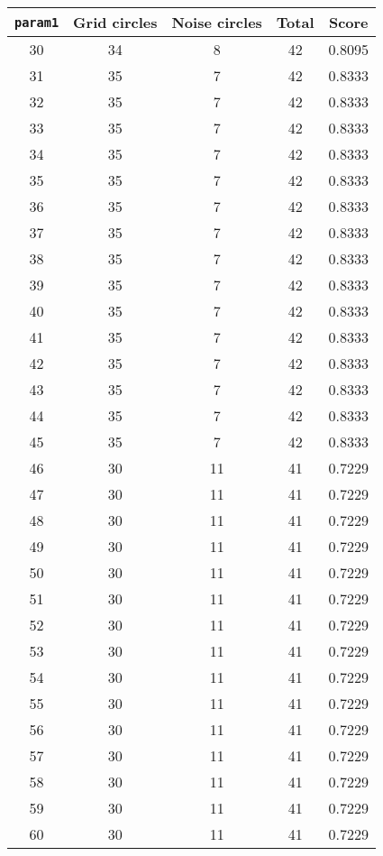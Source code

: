 \documentclass[letterpaper, 12pt]{article}
\begin{document}
\begin{longtable}{|c|c|c|c|c|}
\hline
\textbf{\texttt{param1}} & \textbf{Grid circles} & \textbf{Noise circles} & \textbf{Total} & \textbf{Score} \\
\hline
30 & 34 & 8 & 42 & 0.8095 \\
\hline
31 & 35 & 7 & 42 & 0.8333 \\
\hline
32 & 35 & 7 & 42 & 0.8333 \\
\hline
33 & 35 & 7 & 42 & 0.8333 \\
\hline
34 & 35 & 7 & 42 & 0.8333 \\
\hline
35 & 35 & 7 & 42 & 0.8333 \\
\hline
36 & 35 & 7 & 42 & 0.8333 \\
\hline
37 & 35 & 7 & 42 & 0.8333 \\
\hline
38 & 35 & 7 & 42 & 0.8333 \\
\hline
39 & 35 & 7 & 42 & 0.8333 \\
\hline
40 & 35 & 7 & 42 & 0.8333 \\
\hline
41 & 35 & 7 & 42 & 0.8333 \\
\hline
42 & 35 & 7 & 42 & 0.8333 \\
\hline
43 & 35 & 7 & 42 & 0.8333 \\
\hline
44 & 35 & 7 & 42 & 0.8333 \\
\hline
45 & 35 & 7 & 42 & 0.8333 \\
\hline
46 & 30 & 11 & 41 & 0.7229 \\
\hline
47 & 30 & 11 & 41 & 0.7229 \\
\hline
48 & 30 & 11 & 41 & 0.7229 \\
\hline
49 & 30 & 11 & 41 & 0.7229 \\
\hline
50 & 30 & 11 & 41 & 0.7229 \\
\hline
51 & 30 & 11 & 41 & 0.7229 \\
\hline
52 & 30 & 11 & 41 & 0.7229 \\
\hline
53 & 30 & 11 & 41 & 0.7229 \\
\hline
54 & 30 & 11 & 41 & 0.7229 \\
\hline
55 & 30 & 11 & 41 & 0.7229 \\
\hline
56 & 30 & 11 & 41 & 0.7229 \\
\hline
57 & 30 & 11 & 41 & 0.7229 \\
\hline
58 & 30 & 11 & 41 & 0.7229 \\
\hline
59 & 30 & 11 & 41 & 0.7229 \\
\hline
60 & 30 & 11 & 41 & 0.7229 \\

\end{longtable}
\end{document}
